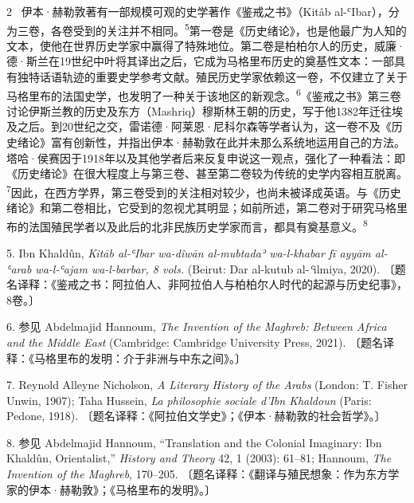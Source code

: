 \documentclass[10pt,a4paper]{article}
\begin{document}
\begin{paracol}{2}
\switchcolumn*
{\scriptsize\color{gray} [p. 2]}\ 伊本·赫勒敦著有一部规模可观的史学著作《鉴戒之书》（Kitâb al-ʿIbar），分为三卷，各卷受到的关注并不相\mbox{同。\textsuperscript{5}}第一卷是《历史绪论》，也是他最广为人知的文本，使他在世界历史学家中赢得了特殊地位。第二卷是柏柏尔人的历史，威廉·德·斯兰在19世纪中叶将其译出之后，它成为马格里布历史的奠基性文本：一部具有独特话语轨迹的重要史学参考文献。殖民历史学家依赖这一卷，不仅建立了关于马格里布的法国史学，也发明了一种关于该地区的新观\mbox{念。\textsuperscript{6}}《鉴戒之书》第三卷讨论伊斯兰教的历史及东方（Mashriq）穆斯林王朝的历史，写于他1382年迁往埃及之后。到20世纪之交，雷诺德·阿莱恩·尼科尔森等学者认为，这一卷不及《历史绪论》富有创新性，并指出伊本·赫勒敦在此并未那么系统地运用自己的方法。塔哈·侯赛因于1918年以及其他学者后来反复申说这一观点，强化了一种看法：即《历史绪论》在很大程度上与第三卷、甚至第二卷较为传统的史学内容相互脱\mbox{离。\textsuperscript{7}}因此，在西方学界，第三卷受到的关注相对较少，也尚未被译成英语。与《历史绪论》和第二卷相比，它受到的忽视尤其明显；如前所述，第二卷对于研究马格里布的法国殖民学者以及此后的北非民族历史学家而言，都具有奠基意\mbox{义。\textsuperscript{8}}\par{\small 5. Ibn Khaldûn, \textit{Kitāb al-ʿIbar wa-dîwān al-mubtadaʾ wa-l-khabar fī ayyām al-ʿarab wa-l-ʿajam wa-l-barbar, 8 vols.} (Beirut: Dar al-kutub al-\textit{ʿ}ilmiya, 2020). 〔题名译释：《鉴戒之书：阿拉伯人、非阿拉伯人与柏柏尔人时代的起源与历史纪事》，8卷。〕\par}{\small 6. 参见 Abdelmajid Hannoum, \textit{The Invention of the Maghreb: Between Africa and the Middle East} (Cambridge: Cambridge University Press, 2021). 〔题名译释：《马格里布的发明：介于非洲与中东之间》。〕\par}{\small 7. Reynold Alleyne Nicholson, \textit{A Literary History of the Arabs} (London: T. Fisher Unwin, 1907); Taha Hussein, \textit{La philosophie sociale d’Ibn Khaldoun} (Paris: Pedone, 1918). 〔题名译释：《阿拉伯文学史》；《伊本·赫勒敦的社会哲学》。〕\par}{\small 8. 参见 Abdelmajid Hannoum, “Translation and the Colonial Imaginary: Ibn Khaldûn, Orientalist,” \textit{History and Theory} 42, 1 (2003): 61–81; Hannoum, \textit{The Invention of the Maghreb}, 170–205. 〔题名译释：《翻译与殖民想象：作为东方学家的伊本·赫勒敦》；《马格里布的发明》。〕\par}
\switchcolumn

\end{paracol}
\end{document}
